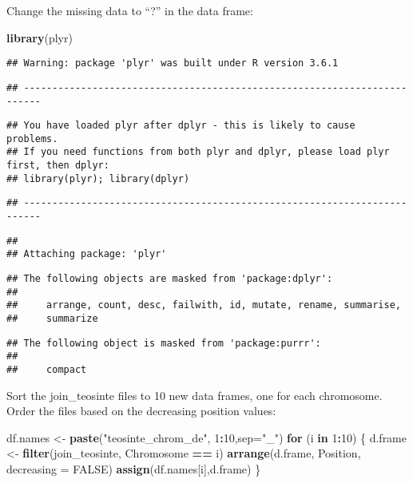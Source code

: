 \documentclass[]{article}
\newenvironment{Shaded}{\begin{snugshade}}{\end{snugshade}}
\newcommand{\ControlFlowTok}[1]{\textcolor[rgb]{0.13,0.29,0.53}{\textbf{#1}}}
\newcommand{\DataTypeTok}[1]{\textcolor[rgb]{0.13,0.29,0.53}{#1}}
\newcommand{\DecValTok}[1]{\textcolor[rgb]{0.00,0.00,0.81}{#1}}
\newcommand{\KeywordTok}[1]{\textcolor[rgb]{0.13,0.29,0.53}{\textbf{#1}}}
\newcommand{\NormalTok}[1]{#1}
\newcommand{\OperatorTok}[1]{\textcolor[rgb]{0.81,0.36,0.00}{\textbf{#1}}}
\newcommand{\OtherTok}[1]{\textcolor[rgb]{0.56,0.35,0.01}{#1}}
\newcommand{\StringTok}[1]{\textcolor[rgb]{0.31,0.60,0.02}{#1}}
\begin{document}
Change the missing data to ``?'' in the data frame:

\begin{Shaded}
\begin{Highlighting}[]
\KeywordTok{library}\NormalTok{(plyr)}
\end{Highlighting}
\end{Shaded}

\begin{verbatim}
## Warning: package 'plyr' was built under R version 3.6.1
\end{verbatim}

\begin{verbatim}
## -------------------------------------------------------------------------
\end{verbatim}

\begin{verbatim}
## You have loaded plyr after dplyr - this is likely to cause problems.
## If you need functions from both plyr and dplyr, please load plyr first, then dplyr:
## library(plyr); library(dplyr)
\end{verbatim}

\begin{verbatim}
## -------------------------------------------------------------------------
\end{verbatim}

\begin{verbatim}
## 
## Attaching package: 'plyr'
\end{verbatim}

\begin{verbatim}
## The following objects are masked from 'package:dplyr':
## 
##     arrange, count, desc, failwith, id, mutate, rename, summarise,
##     summarize
\end{verbatim}

\begin{verbatim}
## The following object is masked from 'package:purrr':
## 
##     compact
\end{verbatim}

Sort the join\_teosinte files to 10 new data frames, one for each
chromosome. Order the files based on the decreasing position values:

\begin{Shaded}
\begin{Highlighting}[]
\NormalTok{df.names <-}\StringTok{ }\KeywordTok{paste}\NormalTok{(}\StringTok{"teosinte_chrom_de"}\NormalTok{, }\DecValTok{1}\OperatorTok{:}\DecValTok{10}\NormalTok{,}\DataTypeTok{sep=}\StringTok{"_"}\NormalTok{)}
\ControlFlowTok{for}\NormalTok{ (i }\ControlFlowTok{in} \DecValTok{1}\OperatorTok{:}\DecValTok{10}\NormalTok{) \{}
\NormalTok{  d.frame <-}\StringTok{ }\KeywordTok{filter}\NormalTok{(join_teosinte, Chromosome }\OperatorTok{==}\StringTok{ }\NormalTok{i)}
  \KeywordTok{arrange}\NormalTok{(d.frame, Position, }\DataTypeTok{decreasing =} \OtherTok{FALSE}\NormalTok{)    }
  \KeywordTok{assign}\NormalTok{(df.names[i],d.frame)}
\NormalTok{\}}
\end{Highlighting}
\end{Shaded}
\end{document}
